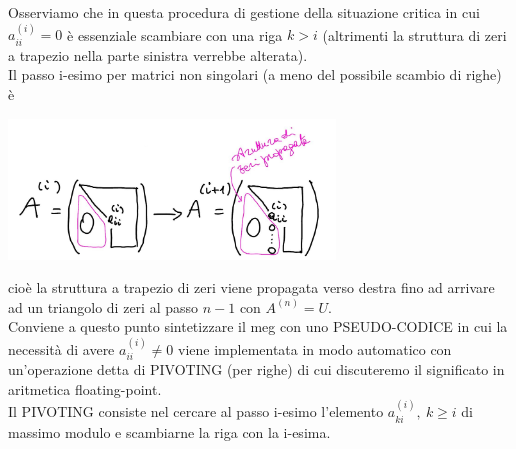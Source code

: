 Osserviamo che in questa procedura di gestione della situazione critica in cui $a_{ii}^{(i)} = 0$ è essenziale scambiare con una riga $k > i$ (altrimenti la struttura di zeri a trapezio nella parte sinistra verrebbe alterata).\\
Il passo i-esimo per matrici non singolari (a meno del possibile scambio di righe) è
\begin{center}
    \includegraphics[width = 0.65\textwidth]{foto/pag20}
\end{center}
cioè la struttura a trapezio di zeri viene propagata verso destra fino ad arrivare ad un triangolo di zeri al passo $n-1$ con $A^{(n)} = U$.\\
Conviene a questo punto sintetizzare il meg con uno PSEUDO-CODICE in cui la necessità di avere $a_{ii}^{(i)} \neq 0$ viene implementata in modo automatico con un'operazione detta di PIVOTING (per righe) di cui discuteremo il significato in aritmetica floating-point.\\
Il PIVOTING consiste nel cercare al passo i-esimo l'elemento $a_{ki}^{(i)}, \ k \ge i$ di massimo modulo e scambiarne la riga con la i-esima.

